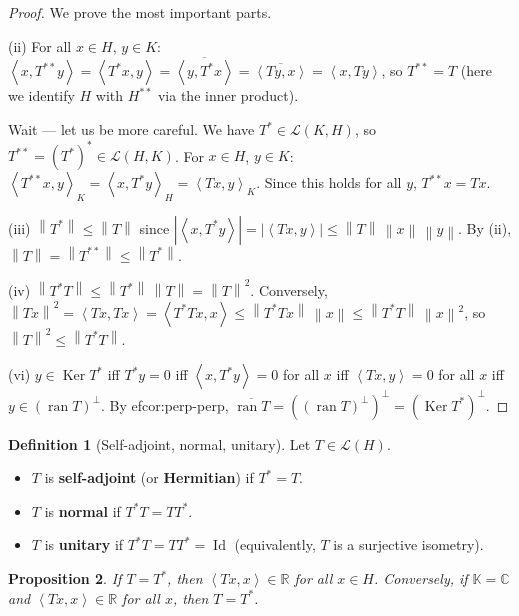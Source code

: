 \documentclass[a4paper,12pt]{book}
\DeclareMathOperator{\Id}{Id}
\DeclareMathOperator{\Ker}{Ker}
\DeclareMathOperator{\ran}{ran}
\newcommand{\R}{\mathbb{R}}
\newcommand{\C}{\mathbb{C}}
\newcommand{\K}{\mathbb{K}}
\newcommand{\norm}[1]{\left\| #1 \right\|}
\newcommand{\abs}[1]{\left| #1 \right|}
\newcommand{\inner}[2]{\left\langle #1, #2 \right\rangle}
\theoremstyle{definition}
\newtheorem{definition}{Definition}[chapter]
\theoremstyle{plain}
\newtheorem{proposition}[definition]{Proposition}
\theoremstyle{remark}
\begin{document}
\begin{proof}
We prove the most important parts.

(ii) For all $x\in H$, $y\in K$:
$\inner{x}{T^{**}y}=\inner{T^*x}{y}=\overline{\inner{y}{T^*x}}
=\overline{\inner{Ty}{x}}=\inner{x}{Ty}$, so $T^{**}=T$ (here we
identify $H$ with $H^{**}$ via the inner product).

Wait --- let us be more careful.  We have $T^*\in\mathcal{L}(K,H)$,
so $T^{**}=(T^*)^*\in\mathcal{L}(H,K)$.  For $x\in H$, $y\in K$:
$\inner{T^{**}x}{y}_K=\inner{x}{T^*y}_H=\inner{Tx}{y}_K$.
Since this holds for all $y$, $T^{**}x=Tx$.

(iii) $\norm{T^*}\le\norm{T}$ since
$\abs{\inner{x}{T^*y}}=\abs{\inner{Tx}{y}}\le\norm{T}\,\norm{x}\,\norm{y}$.
By (ii), $\norm{T}=\norm{T^{**}}\le\norm{T^*}$.

(iv) $\norm{T^*T}\le\norm{T^*}\,\norm{T}=\norm{T}^2$.  Conversely,
$\norm{Tx}^2=\inner{Tx}{Tx}=\inner{T^*Tx}{x}\le\norm{T^*Tx}\,\norm{x}
\le\norm{T^*T}\,\norm{x}^2$, so $\norm{T}^2\le\norm{T^*T}$.

(vi) $y\in\Ker T^*$ iff $T^*y=0$ iff $\inner{x}{T^*y}=0$ for all $x$
iff $\inner{Tx}{y}=0$ for all $x$ iff $y\in(\ran T)^\perp$.
By 
ef{cor:perp-perp}, $\overline{\ran T}=((\ran T)^\perp)^\perp=(\Ker T^*)^\perp$.
\end{proof}

\begin{definition}[Self-adjoint, normal, unitary]
\label{def:special-operators}
Let $T\in\mathcal{L}(H)$.
\begin{itemize}
  \item $T$ is \textbf{self-adjoint} (or \textbf{Hermitian}) if $T^*=T$.
  \item $T$ is \textbf{normal} if $T^*T=TT^*$.
  \item $T$ is \textbf{unitary} if $T^*T=TT^*=\Id$ (equivalently, $T$
        is a surjective isometry).
\end{itemize}
\end{definition}

\begin{proposition}
\label{prop:self-adjoint-real-spectrum}
If $T=T^*$, then $\inner{Tx}{x}\in\R$ for all $x\in H$.  Conversely,
if $\K=\C$ and $\inner{Tx}{x}\in\R$ for all $x$, then $T=T^*$.
\end{proposition}
\end{document}
